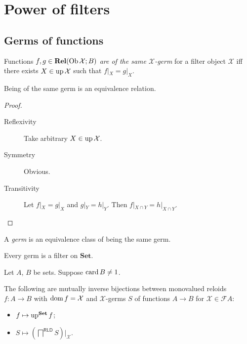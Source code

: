 \chapter{Power of filters}

\section{Germs of functions}

\begin{defn}
  Functions $f, g \in \mathbf{Rel} (\operatorname{Ob} \mathcal{X} ; B)$
  \emph{are of the same $\mathcal{X}$-germ} for a filter object
  $\mathcal{X}$ iff there exists $X \in \operatorname{up} \mathcal{X}$ such that $f|_X
  = g|_X$.
\end{defn}

\begin{prop}
  Being of the same germ is an equivalence relation.
\end{prop}

\begin{proof}
  
  \begin{description}
    \item[Reflexivity] Take arbitrary $X \in \operatorname{up} \mathcal{X}$.
    
    \item[Symmetry] Obvious.
    
    \item[Transitivity] Let $f|_X = g|_X$ and $g|_Y = h|_Y$. Then $f|_{X \cap
    Y} = h|_{X \cap Y}$.
  \end{description}
\end{proof}

\begin{defn}
  A \emph{germ} is an equivalence class of being the same germ.
\end{defn}

\begin{obvious}
Every germ is a filter on $\mathbf{Set}$.
\end{obvious}

\begin{thm}
  Let $A$, $B$ be sets. Suppose $\operatorname{card} B \neq 1$. 

  The following are mutually inverse bijections between monovalued reloids $f
  : A \rightarrow B$ with $\operatorname{dom} f = \mathcal{X}$ and $\mathcal{X}$-germs
  $S$ of functions $A \rightarrow B$ for $\mathcal{X} \in \mathscr{F} A$:
  \begin{itemize}
    \item $f \mapsto \operatorname{up}^{\mathbf{Set}} f$;
    \item $S \mapsto \left(\bigsqcap^{\mathsf{RLD}} S\right)|_{\mathcal{X}}$.
  \end{itemize}
\end{thm}


